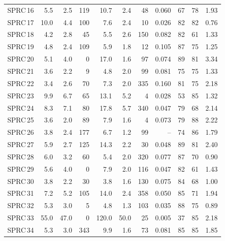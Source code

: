 \documentclass{ab}
\begin{document}
\begin{table}
\begin{tabular}{l|r|r|r|r|r|r|r|r|r|r}
 SPRC\,16&   5.5 &    2.5 &   119 &   10.7 &    2.4 &    48 &  0.060 &     67 &     78 &   1.93 \\
 SPRC\,17&  10.0 &    4.4 &   100 &    7.6 &    2.4 &    10 &  0.026 &     82 &     82 &   0.76 \\
 SPRC\,18&   4.2 &    2.8 &    45 &    5.5 &    2.6 &   150 &  0.082 &     82 &     61 &   1.33 \\
 SPRC\,19&   4.8 &    2.4 &   109 &    5.9 &    1.8 &    12 &  0.105 &     87 &     75 &   1.25 \\
 SPRC\,20&   5.1 &    4.0 &     0 &   17.0 &    1.6 &    97 &  0.074 &     89 &     81 &   3.34 \\
 SPRC\,21&   3.6 &    2.2 &     9 &    4.8 &    2.0 &    99 &  0.081 &     75 &     75 &   1.33 \\
 SPRC\,22&   3.4 &    2.6 &    70 &    7.3 &    2.0 &   335 &  0.160 &     81 &     75 &   2.18 \\
 SPRC\,23&   9.9 &    6.7 &    65 &   13.1 &    5.2 &     4 &  0.028 &     53 &     85 &   1.32 \\
 SPRC\,24&   8.3 &    7.1 &    80 &   17.8 &    5.7 &   340 &  0.047 &     79 &     68 &   2.14 \\
 SPRC\,25&   3.6 &    2.0 &    89 &    7.9 &    1.6 &     4 &  0.073 &     79 &     88 &   2.22 \\
 SPRC\,26&   3.8 &    2.4 &   177 &    6.7 &    1.2 &    99 &     -- &     74 &     86 &   1.79 \\
 SPRC\,27&   5.9 &    2.7 &   125 &   14.3 &    2.2 &    30 &  0.048 &     89 &     81 &   2.40 \\
 SPRC\,28&   6.0 &    3.2 &    60 &    5.4 &    2.0 &   320 &  0.077 &     87 &     70 &   0.90 \\
 SPRC\,29&   5.6 &    4.0 &     0 &    7.9 &    2.0 &   116 &  0.047 &     82 &     61 &   1.43 \\
 SPRC\,30&   3.8 &    2.2 &    30 &    3.8 &    1.6 &   130 &  0.075 &     84 &     68 &   1.00 \\
SPRC\,31&   7.2 &    5.2 &   105 &   14.0 &    2.4 &   358 &  0.050 &     85 &     71 &   1.94 \\
 SPRC\,32&   5.3 &    3.0 &     5 &    4.8 &    1.3 &   103 &  0.035 &     88 &     75 &   0.89 \\
 SPRC\,33&  55.0 &   47.0 &     0 &  120.0 &   50.0 &    25 &  0.005 &     37 &     85 &   2.18 \\
 SPRC\,34&   5.3 &    3.0 &   343 &    9.9 &    1.6 &    73 &  0.081 &     85 &     85 &   1.85 \\

\end{tabular}
\end{table}
\end{document}
